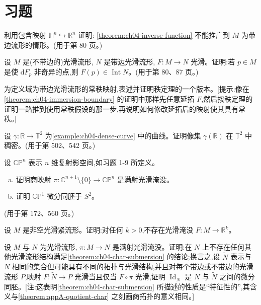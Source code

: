 \documentclass[../../main.tex]{subfiles}
\begin{document}
\section{习题}\label{section:ch04-习题}

\begin{exercise}\label{exercise:ch04-p4-1}
利用包含映射 $\mathbb{H}^n\hookrightarrow\mathbb{R}^n$ 证明: \cref{theorem:ch04-inverse-function} 不能推广到 $M$ 为带边流形的情形。(用于第 80 页。)
\end{exercise}

\begin{exercise}\label{exercise:ch04-p4-2}
设 $M$ 是(不带边的)光滑流形, $N$ 是带边光滑流形, $F:M\to N$ 光滑。证明:若 $p\in M$ 是使 $\mathrm{d}F_p$ 非奇异的点,则 $F(p)\in\operatorname{Int}N$。(用于第 80、87 页。)
\end{exercise}

\begin{exercise}\label{exercise:ch04-p4-3}
为定义域为带边光滑流形的常秩映射,表述并证明秩定理的一个版本。[提示:像在\cref{theorem:ch04-immersion-boundary} 的证明中那样先任意延拓 $F$,然后按秩定理的证明一路推到使用常秩假设的那一步,再说明如何修改延拓后的映射使其具有常秩。]
\end{exercise}

\begin{exercise}\label{exercise:ch04-p4-4}
设 $\gamma:\mathbb{R}\to\mathbb{T}^2$ 为\cref{example:ch04-dense-curve} 中的曲线。证明像集 $\gamma(\mathbb{R})$ 在 $\mathbb{T}^2$ 中稠密。(用于第 502、542 页。)
\end{exercise}

\begin{exercise}\label{exercise:ch04-p4-5}
设 $\mathbb{CP}^n$ 表示 $n$ 维复射影空间,如习题 1-9 所定义。
\begin{enumerate}[(a)]
\item 证明商映射 $\pi:\mathbb{C}^{n+1}\setminus\{0\}\to\mathbb{CP}^n$ 是满射光滑淹没。
\item 证明 $\mathbb{CP}^1$ 微分同胚于 $S^2$。
\end{enumerate}
(用于第 172、560 页。)
\end{exercise}

\begin{exercise}\label{exercise:ch04-p4-6}
设 $M$ 是非空光滑紧流形。证明:对任何 $k>0$,不存在光滑淹没 $F:M\to\mathbb{R}^k$。
\end{exercise}

\begin{exercise}\label{exercise:ch04-p4-7}
设 $M$ 与 $N$ 为光滑流形, $\pi:M\to N$ 是满射光滑淹没。证明:在 $N$ 上不存在任何其他光滑流形结构满足\cref{theorem:ch04-char-submersion} 的结论;换言之,设 $\widetilde{N}$ 表示与 $N$ 相同的集合但可能具有不同的拓扑与光滑结构,并且对每个带边或不带边的光滑流形 $P$,映射 $F:\widetilde{N}\to P$ 光滑当且仅当 $F\circ\pi$ 光滑,证明 $\operatorname{Id}_N$ 是 $N$ 与 $\widetilde{N}$ 之间的微分同胚。[注:这表明\cref{theorem:ch04-char-submersion} 所描述的性质是``特征性的'',其含义与\cref{theorem:appA-quotient-char} 之刻画商拓扑的意义相同。]
\end{exercise}
\end{document}
